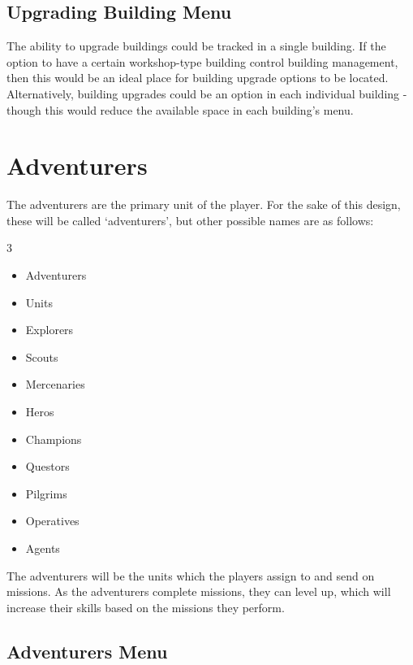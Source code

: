 \subsection{Upgrading Building Menu}

The ability to upgrade buildings could be tracked in a single building. If the option to have a certain workshop-type building control building management, then this would be an ideal place for building upgrade options to be located. Alternatively, building upgrades could be an option in each individual building - though this would reduce the available space in each building's menu.














\section{Adventurers}

The adventurers are the primary unit of the player. For the sake of this design, these will be called `adventurers', but other possible names are as follows:

\begin{multicols}{3}
	\begin{itemize}[noitemsep, topsep=0pt]
		\item Adventurers
		\item Units
		\item Explorers
		\item Scouts
		\item Mercenaries
		\item Heros
		\item Champions
		\item Questors
		\item Pilgrims
		\item Operatives
		\item Agents
	\end{itemize}
\end{multicols}

The adventurers will be the units which the players assign to and send on missions. As the adventurers complete missions, they can level up, which will increase their skills based on the missions they perform. 

\subsection{Adventurers Menu}

